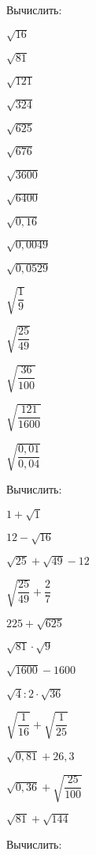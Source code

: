 \begin{class}[number=2]
	\begin{listofex}
		\item Вычислить: 
		\begin{enumcols}[itemcolumns=4]
			\item \( \sqrt{16} \)
			\item \( \sqrt{81} \)
			\item \( \sqrt{121} \)
			\item \( \sqrt{324} \)
			\item \( \sqrt{625} \)
			\item \( \sqrt{676} \)
			\item \( \sqrt{3600} \)
			\item \( \sqrt{6400} \)
			\item \( \sqrt{0,16} \)
			\item \( \sqrt{0,0049} \)
			\item \( \sqrt{0,0529} \)
			\item \( \sqrt{\dfrac{1}{9}} \)
			\item \( \sqrt{\dfrac{25}{49}} \)
			\item \( \sqrt{\dfrac{36}{100}} \)
			\item \( \sqrt{\dfrac{121}{1600}} \)
			\item \( \sqrt{\dfrac{0,01}{0,04}} \)
		\end{enumcols}
		\item Вычислить:
		\begin{enumcols}[itemcolumns=4]
			\item \( 1+\sqrt{1} \)
			\item \( 12-\sqrt{16} \)
			\item \( \sqrt{25}+\sqrt{49}-12 \)
			\item \( \sqrt{\dfrac{25}{49}}+\dfrac{2}{7} \)
			\item \( 225+\sqrt{625} \)
			\item \( \sqrt{81}\cdot\sqrt{9} \)
			\item \( \sqrt{1600}-1600 \)
			\item \( \sqrt{4}:2\cdot\sqrt{36} \)
			\item \( \sqrt{\dfrac{1}{16}}+\sqrt{\dfrac{1}{25}}\)
			\item \( \sqrt{0,81}+26,3 \)
			\item \( \sqrt{0,36}+\sqrt{\dfrac{25}{100}} \)
			\item \( \sqrt{81}+\sqrt{144} \)
		\end{enumcols}
		\item Вычислить:

\end{listofex}
\end{class}
